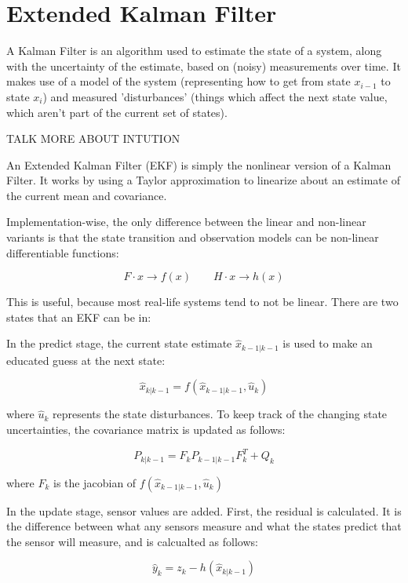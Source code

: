\section{Extended Kalman Filter}


A Kalman Filter is an algorithm used to estimate the state of a system, along with the uncertainty of the estimate, based on (noisy) measurements over time. It makes use of a model of the system (representing how to get from state $x_{i-1}$ to state $x_i$) and measured 'disturbances' (things which affect the next state value, which aren't part of the current set of states).


{\Large \color{red} TALK MORE ABOUT INTUTION}

An Extended Kalman Filter (EKF) is simply the nonlinear version of a Kalman Filter. It works by using a Taylor approximation to linearize about an estimate of the current mean and covariance.

Implementation-wise, the only difference between the linear and non-linear variants is that the state transition and observation models can be non-linear differentiable functions:

$$ F \cdot x \rightarrow f(x) \qquad H\cdot x \rightarrow h(x) $$

This is useful, because most real-life systems tend to not be linear. There are two states that an EKF can be in:

In the predict stage, the current state estimate $\hat{x}_{k-1|k-1}$ is used to make an educated guess at the next state:

$$ \hat{x}_{k|k-1} = f(\hat{x}_{k-1|k-1}, \hat{u}_k) $$

where $\hat{u}_k$ represents the state disturbances. To keep track of the changing state uncertainties, the covariance matrix is updated as follows:

$$ P_{k|k-1} = F_k P_{k-1|k-1} F_k^T + Q_k $$

where $F_k$ is the jacobian of $f(\hat{x}_{k-1|k-1}, \hat{u}_k)$

In the update stage, sensor values are added. First, the residual is calculated. It is the difference between what any sensors measure and what the states predict that the sensor will measure, and is calcualted as follows:

\[ \hat{y}_k = z_k - h(\hat{x}_{k|k-1}) \]
